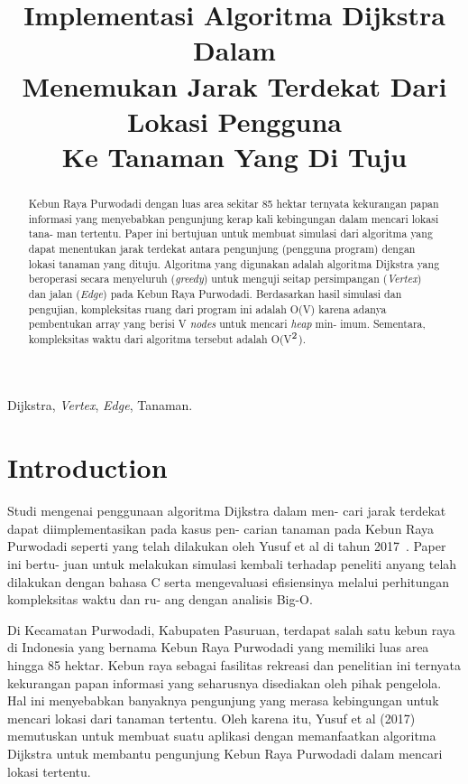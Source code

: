 \documentclass[conference]{IEEEtran}
\title{Implementasi Algoritma Dijkstra Dalam\\
Menemukan Jarak Terdekat Dari Lokasi Pengguna\\
Ke Tanaman Yang Di Tuju}
\author{\IEEEauthorblockN{Atadila Belva Ganya}
\IEEEauthorblockA{\textit{School of Electrical Engineering and Informatics}\\
\textit{Institut Teknologi Bandung}\\
Bandung, Indonesia\\
Email: 18320015@std.stei.itb.ac.id}
}
\begin{document}
\maketitle

\begin{abstract}
    Kebun Raya Purwodadi dengan luas area sekitar 85
    hektar ternyata kekurangan papan informasi yang menyebabkan
    pengunjung kerap kali kebingungan dalam mencari lokasi tana-
    man tertentu. Paper ini bertujuan untuk membuat simulasi
    dari algoritma yang dapat menentukan jarak terdekat antara
    pengunjung (pengguna program) dengan lokasi tanaman yang
    dituju. Algoritma yang digunakan adalah algoritma Dijkstra
    yang beroperasi secara menyeluruh (\emph{greedy}) untuk menguji
    seitap persimpangan (\emph{Vertex}) dan jalan (\emph{Edge}) pada Kebun
    Raya Purwodadi. Berdasarkan hasil simulasi dan pengujian,
    kompleksitas ruang dari program ini adalah O(V) karena adanya
    pembentukan array yang berisi V \emph{nodes} untuk mencari \emph{heap} min-
    imum. Sementara, kompleksitas waktu dari algoritma tersebut
    adalah O(V$\sp{2}$).
\end{abstract}

\begin{IEEEkeywords}
    Dijkstra, \emph{Vertex}, \emph{Edge}, Tanaman.
\end{IEEEkeywords}

\section{Introduction}
    Studi mengenai penggunaan algoritma Dijkstra dalam men-
    cari  jarak  terdekat  dapat  diimplementasikan  pada  kasus  pen-
    carian tanaman pada Kebun Raya Purwodadi seperti yang telah
    dilakukan oleh Yusuf et al di tahun 2017~\cite{j-ptiik}. Paper ini bertu-
    juan  untuk  melakukan  simulasi  kembali  terhadap  peneliti
    anyang  telah  dilakukan  dengan  bahasa  C  serta  mengevaluasi
    efisiensinya  melalui  perhitungan  kompleksitas  waktu  dan  ru-
    ang dengan analisis Big-O.\par

    Di  Kecamatan  Purwodadi,  Kabupaten  Pasuruan,  terdapat
    salah  satu  kebun  raya  di  Indonesia  yang  bernama  Kebun
    Raya  Purwodadi  yang  memiliki  luas  area  hingga  85  hektar.
    Kebun raya sebagai fasilitas rekreasi dan penelitian ini ternyata
    kekurangan papan informasi yang seharusnya disediakan oleh
    pihak pengelola. Hal ini menyebabkan banyaknya pengunjung
    yang merasa kebingungan untuk mencari lokasi dari tanaman
    tertentu.  Oleh  karena  itu,  Yusuf  et  al  (2017)  memutuskan
    untuk membuat suatu aplikasi dengan memanfaatkan algoritma
    Dijkstra untuk membantu pengunjung Kebun Raya Purwodadi
    dalam mencari lokasi tertentu.\par
\end{document}
